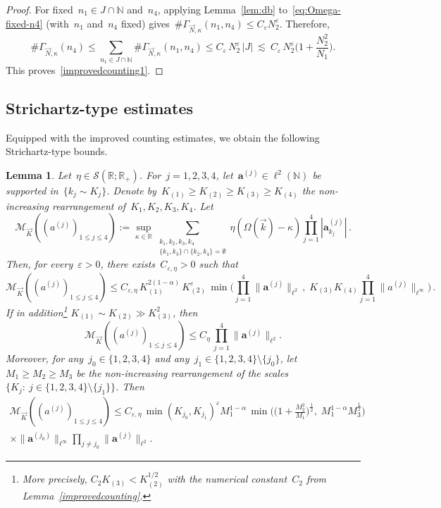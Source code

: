 \documentclass[11pt,reqno,english]{amsart}
\numberwithin{equation}{section}
\theoremstyle{plain}
\newtheorem{lemma}[theorem]{Lemma}
\theoremstyle{definition}
\theoremstyle{remark}
\newcommand{\R}{\mathbb{R}}
\newcommand{\N}{\mathbb{N}}
\begin{document}
\begin{proof}
	For fixed~$n_1\in J\cap\N$ and~$n_4$, applying Lemma~\ref{lem:db} to~\eqref{eq:Omega-fixed-n4} (with~$n_1$ and~$n_4$ fixed)
	gives~$\#\Gamma_{\vec{N},\kappa}(n_1,n_4)\le C_\varepsilon N_2^\varepsilon$.
	Therefore,
	\[
	\#\Gamma_{\vec{N},\kappa}(n_4)
	\le \sum_{n_1\in J\cap\N}\#\Gamma_{\vec{N},\kappa}(n_1,n_4)
	\le C_\varepsilon\,N_2^\varepsilon\,|J|
	\ \lesssim\ C_\varepsilon\,N_2^\varepsilon\Big(1+\frac{N_2^2}{N_1}\Big).
	\]
	This proves~\eqref{improvedcounting1}.
\end{proof}


\subsection{Strichartz-type estimates}

Equipped with the improved counting estimates, we obtain the following Strichartz-type bounds.

\begin{lemma}\label{timeStrichart}
	Let~$\eta\in\mathcal{S}(\R;\R_{+})$. For~$j=1,2,3,4$, let~$\mathbf{a}^{(j)}\in\ell^{2}(\N)$ be
	supported in~$\{k_j\sim K_j\}$. Denote by~$K_{(1)}\ge K_{(2)}\ge K_{(3)}\ge K_{(4)}$ the non-increasing rearrangement of~$K_1,K_2,K_3,K_4$. Let
	\[
	\mathcal{M}_{\vec{K}}((a^{(j)})_{1\leq j\leq 4})
	:=
	\sup_{\kappa\in\R}
	\sum_{\substack{k_{1},k_{2},k_{3},k_{4}\\
			\{k_{1},k_{3}\}\cap\{k_{2},k_{4}\}=\emptyset}}
	\eta(\Omega(\vec k)-\kappa)\prod_{j=1}^{4}|\mathbf{a}^{(j)}_{k_{j}}|\,.
	\]
	Then, for every~$\varepsilon>0$, there exists~$C_{\varepsilon,\eta}>0$ such that
	\begin{equation}
		\label{Strichartztype1}
		\mathcal{M}_{\vec{K}}((a^{(j)})_{1\leq j\leq 4})
		\le
		C_{\varepsilon,\eta}\,
		K_{(1)}^{2(1-\alpha)}\,
		K_{(2)}^{\varepsilon}\,
		\min
		\Big(
		\prod_{j=1}^{4}\|\mathbf{a}^{(j)}\|_{\ell^{2}}\,,\;
		K_{(3)}K_{(4)}
		\prod_{j=1}^{4}
		\|a^{(j)}\|_{\ell^{\infty}}
		\Big)\,.
	\end{equation}
	If in addition\footnote{More precisely, $C_2K_{(3)}< K_{(2)}^{1/2}$ with the numerical constant~$C_2$ from Lemma~\ref{improvedcounting}.} $K_{(1)}\sim K_{(2)}\gg K_{(3)}^2$, then
	\begin{equation}\label{Strichartztype1'}
		\mathcal{M}_{\vec{K}}((a^{(j)})_{1\leq j\leq 4})
		\le
		C_{\eta}\,
		\prod_{j=1}^{4}\|\mathbf{a}^{(j)}\|_{\ell^{2}}.
	\end{equation}
	Moreover, for any~$j_0\in\{1,2,3,4\}$ and any~$j_1\in\{1,2,3,4\}\setminus\{j_0\}$,
	let~$M_1\ge M_2\ge M_3$ be the non-increasing rearrangement of the scales~$\{K_j:\ j\in\{1,2,3,4\}\setminus\{j_1\}\}$. Then
	\begin{multline}
		\label{Strichartztype2}
		\mathcal{M}_{\vec{K}}((a^{(j)})_{1\leq j\leq 4})
		\le
		C_{\varepsilon,\eta}\,
		\min(K_{j_0},K_{j_1})^{\varepsilon}M_1^{1-\alpha} \,
		\min\Big(\Big(1+\frac{M_{2}^{2}}{M_{1}}\Big)^\frac12,\; M_{1}^{1-\alpha}M_{3}^\frac12\Big)
		\\
		\times\|\mathbf{a}^{(j_0)}\|_{\ell^{\infty}}\prod_{j\neq j_0}\|\mathbf{a}^{(j)}\|_{\ell^{2}}.
	\end{multline}
\end{lemma}
\end{document}
